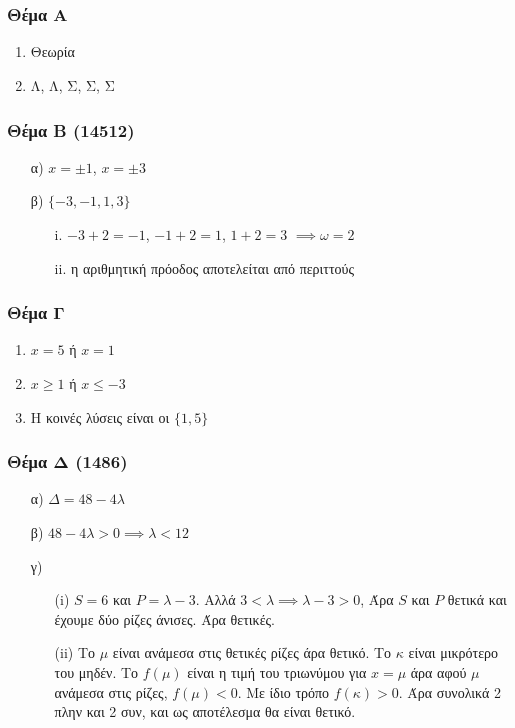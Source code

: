 \documentclass[12pt]{article}
\begin{document}
\part*{}

\section*{Θέμα Α}
  \noindent
  \begin{enumerate}
    \item Θεωρία
    \item Λ, Λ, Σ, Σ, Σ
  \end{enumerate}

\section*{Θέμα Β (14512)}
  \noindent
    \begin{enumerate}
      \item [α)] $x=\pm 1$, $x=\pm 3$
      \item [β)] $\{-3,-1,1,3\}$
        \begin{enumerate}
          \item [i.] $-3+2=-1$, $-1+2=1$, $1+2=3$ $\implies ω=2$
          \item [ii.] η αριθμητική πρόοδος αποτελείται από περιττούς
        \end{enumerate}
    \end{enumerate}

\section*{Θέμα Γ}
  \noindent
  \begin{enumerate}
    \item $x=5$ ή $x=1$
    \item $x\ge 1$ ή $x\le -3$
    \item Η κοινές λύσεις είναι οι $\{1,5\}$
  \end{enumerate}

\section*{Θέμα Δ (1486)}
  \noindent
  \begin{enumerate}
    \item [α)] $Δ=48-4λ$
    \item [β)] $48-4λ>0\implies λ<12$
    \item [γ)]
    \begin{enumerate}
      \item [(i)] $S=6$ και $P=λ-3$. Αλλά $3<λ\implies λ-3>0$, Άρα $S$ και $P$ θετικά και έχουμε δύο ρίζες άνισες. Άρα θετικές.
      \item [(ii)] Το $μ$ είναι ανάμεσα στις θετικές ρίζες άρα θετικό. Το $κ$ είναι μικρότερο του μηδέν. Το $f(μ)$ είναι η τιμή του τριωνύμου για $x=μ$ άρα αφού $μ$ ανάμεσα στις ρίζες, $f(μ)<0$. Με ίδιο τρόπο $f(κ)>0$. Άρα συνολικά 2 πλην και 2 συν, και ως αποτέλεσμα θα είναι θετικό.
    \end{enumerate}
  \end{enumerate}
\end{document}
